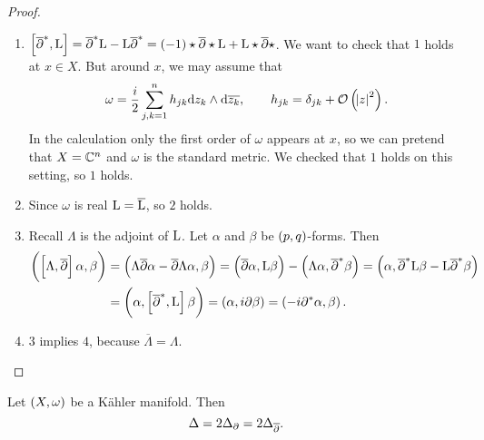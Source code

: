 \begin{proof}
\hfill
\begin{enumerate}
\item $ \sbr{\dab^*, \L} = \dab^*\L - \L\dab^* = \br{-1}\star\dab\star\L + \L\star\dab\star $. We want to check that $ 1 $ holds at $ x \in X $. But around $ x $, we may assume that
$$ \omega = \dfrac{i}{2}\sum_{j, k = 1}^n h_{jk}\d z_k \wedge \d\overline{z_k}, \qquad h_{jk} = \delta_{jk} + \OOO\br{\abs{z}^2}. $$
In the calculation only the first order of $ \omega $ appears at $ x $, so we can pretend that $ X = \mathbb{C}^n $ and $ \omega $ is the standard metric. We checked that $ 1 $ holds on this setting, so $ 1 $ holds.
\item Since $ \omega $ is real $ \mathrm{L} = \overline{\mathrm{L}} $, so $ 2 $ holds.
\item Recall $ \Lambda $ is the adjoint of $ \mathrm{L} $. Let $ \alpha $ and $ \beta $ be $ \br{p, q} $-forms. Then
\begin{align*}
\br{\sbr{\Lambda, \dab}\alpha, \beta}
& = \br{\Lambda\dab\alpha - \dab\Lambda\alpha, \beta}
= \br{\dab\alpha, \L\beta} - \br{\Lambda\alpha, \dab^*\beta}
= \br{\alpha, \dab^*\L\beta - \L\dab^*\beta} \\
& = \br{\alpha, \sbr{\dab^*, \L}\beta}
= \br{\alpha, i\da\beta}
= \br{-i\da^*\alpha, \beta}.
\end{align*}
\item $ 3 $ implies $ 4 $, because $ \overline{\Lambda} = \Lambda $.
\end{enumerate}
\end{proof}

\pagebreak

\begin{theorem}
\label{thm:6.33}
Let $ \br{X, \omega} $ be a K\"ahler manifold. Then
$$ \Delta = 2\Delta_\partial = 2\Delta_{\overline{\partial}}. $$
\end{theorem}

